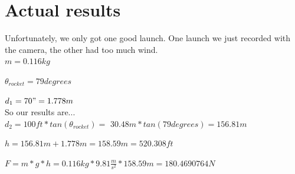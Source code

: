 \documentclass{article}
\begin{document}
\section{Actual results}

Unfortunately, we only got one good launch.
One launch we just recorded with the camera, the other had too much wind. \\

$m=0.116kg$

$\theta_{rocket}=79 degrees$

$d_1=70"=1.778m$ \\

So our results are... \\

$d_2=100ft*tan(\theta_{rocket})=$
$30.48m*tan(79 degrees)=156.81m$

$h=156.81m+1.778m=158.59m=520.308ft$

$F=m*g*h=0.116kg*9.81\frac{m}{s^2}*158.59m=180.4690764N$


\end{document}
